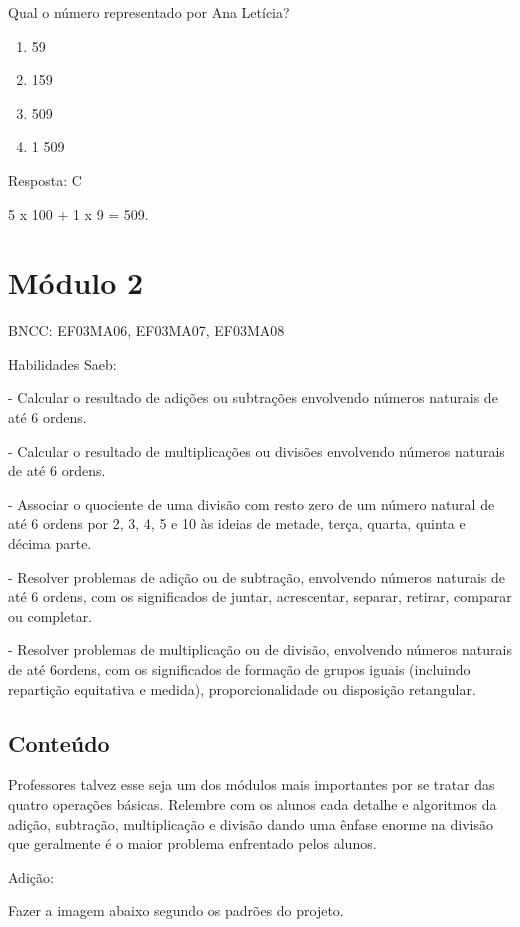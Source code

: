 Qual o número representado por Ana Letícia?

\begin{enumerate}
\def\labelenumi{\alph{enumi})}
\item
  59
\item
  159
\item
  509
\item
  1 509
\end{enumerate}

Resposta: C

5 x 100 + 1 x 9 = 509.

\section{Módulo 2}\label{muxf3dulo-2}

BNCC: EF03MA06, EF03MA07, EF03MA08

Habilidades Saeb:

- Calcular o resultado de adições ou subtrações envolvendo números
naturais de até 6 ordens.

- Calcular o resultado de multiplicações ou divisões envolvendo números
naturais de até 6 ordens.

- Associar o quociente de uma divisão com resto zero de um número
natural de até 6 ordens por 2, 3, 4, 5 e 10 às ideias de metade, terça,
quarta, quinta e décima parte.

- Resolver problemas de adição ou de subtração, envolvendo números
naturais de até 6 ordens, com os significados de juntar, acrescentar,
separar, retirar, comparar ou completar.

- Resolver problemas de multiplicação ou de divisão, envolvendo números
naturais de até 6ordens, com os significados de formação de grupos
iguais (incluindo repartição equitativa e medida), proporcionalidade ou
disposição retangular.

\subsection{Conteúdo}\label{conteuxfado-1}

Professores talvez esse seja um dos módulos mais importantes por se
tratar das quatro operações básicas. Relembre com os alunos cada detalhe
e algoritmos da adição, subtração, multiplicação e divisão dando uma
ênfase enorme na divisão que geralmente é o maior problema enfrentado
pelos alunos.

Adição:

Fazer a imagem abaixo segundo os padrões do projeto.

